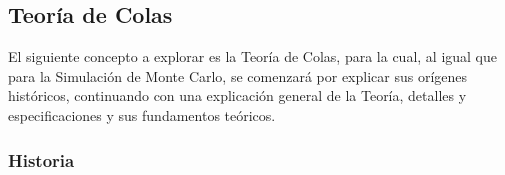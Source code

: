 \begin{itemize}
    
    
    

    
\end{itemize}




\subsection{Teoría de Colas} %

\noindent El siguiente concepto a explorar es la Teoría de Colas, para la cual, al igual que para la Simulación de Monte Carlo, se comenzará por explicar sus orígenes históricos, continuando con una explicación general de la Teoría, detalles y especificaciones y sus fundamentos teóricos.

\subsubsection{Historia} %

